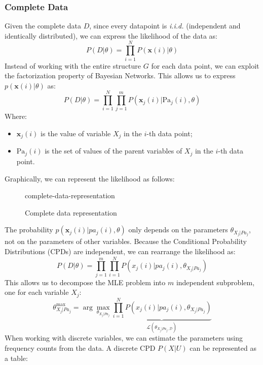 \subsubsection{Complete Data}
Given the complete data $D$, since every datapoint is \textit{i.i.d.} (independent and identically distributed), 
we can express the likelihood of the data as:
\begin{equation}
    P(D|\theta) = \prod_{i=1}^{N} P(\boldsymbol{x}(i) | \theta)
\end{equation}
Instead of working with the entire structure $G$ for each data point, we can exploit the 
factorization property of Bayesian Networks. This allows us to express $p(\boldsymbol{x}(i) | \theta)$ as:
\begin{equation}
    P(D|\theta) = \prod_{i=1}^{N} \prod_{j=1}^{m} P(\boldsymbol{x}_{j}(i) | \text{Pa}_{j}(i),\theta)
\end{equation}
Where:
\begin{itemize}
    \item $\boldsymbol{x}_{j}(i)$ is the value of variable $X_j$ in the $i$-th data point;
    \item $\text{Pa}_{j}(i)$ is the set of values of the parent variables of $X_j$ in the $i$-th data point.
\end{itemize}
Graphically, we can represent the likelihood as follows:
\begin{figure}[H]
\centering
    {complete-data-representation}
    \caption{Complete data representation}
\end{figure}
The probability $p(\boldsymbol{x}_j(i) | pa_j(i), \theta)$ only depends on the parameters $\theta_{X_j|Pa_j}$,
not on the parameters of other variables.
Because the Conditional Probability Distributions (CPDs) are independent, we can rearrange the likelihood as:
\begin{equation}
    P(D|\theta) = \prod_{j=1}^{m} \prod_{i=1}^{N} P(x_j(i) | pa_j(i), \theta_{X_j|Pa_j})
\end{equation}
This allows us to decompose the MLE problem into $m$ independent subproblem, one for each variable $X_j$:
\begin{equation}
    \label{eq:mle-subproblem}
    \theta_{X_j|Pa_j}^{\max} = \arg\max_{\theta_{X_j|Pa_j}}\underbrace{\prod_{i=1}^{N} P(x_j(i) | pa_j(i), \theta_{X_j|Pa_j})}_{\mathcal{L}(\theta_{X_j|Pa_j, \mathcal{D}})}
\end{equation}
When working with discrete variables, we can estimate the parameters using frequency counts from the data.
A discrete CPD $P(X | U)$ can be represented as a table:
